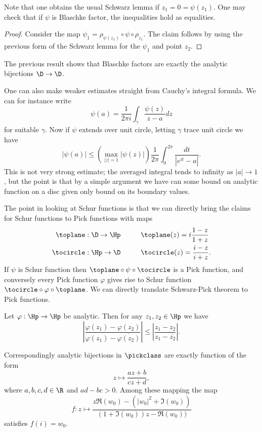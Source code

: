 Note that one obtains the usual Schwarz lemma if $z_{1} = 0 = \psi(z_{1})$. One may check that if $\psi$ is Blaschke factor, the inequalities hold as equalities.
\begin{proof}
	Consider the map $\psi_{1} = \rho_{\psi(z_{1})} \circ \psi \circ \rho_{z_{1}}$. The claim follows by using the previous form of the Schwarz lemma for the $\psi_{1}$ and point $z_{2}$.
\end{proof}

The previous result shows that Blaschke factors are exactly the analytic bijections $\D \to \D$.

One can also make weaker estimates straight from Cauchy's integral formula. We can for instance write
\[
	\psi(a) = \frac{1}{2 \pi i}\int_{\gamma} \frac{\psi(z)}{z - a} dz
\]
for suitable $\gamma$. Now if $\psi$ extends over unit circle, letting $\gamma$ trace unit circle we have
\[
	|\psi(a)| \leq \left(\max_{|z| = 1} \left|\psi(z)\right| \right) \frac{1}{2 \pi}\int_{0}^{2 \pi} \frac{d t}{|e^{i t}  - a|}.
\]
This is not very strong estimate; the averaged integral tends to infinity as $|a| \to 1$, but the point is that by a simple argument we have can some bound on analytic function on a disc given only bound on its boundary values.

The point in looking at Schur functions is that we can directly bring the claims for Schur functions to Pick functions with maps
\begin{align*}
	\toplane : \D \to \Hp & \hspace{1cm} \toplane (z) = i \frac{1 - z}{1 + z} \\
	\tocircle : \Hp \to \D & \hspace{1cm} \tocircle (z) = \frac{i - z}{i + z}.
\end{align*}
If $\psi$ is Schur function then $\toplane \circ \psi \circ \tocircle$ is a Pick function, and conversely every Pick function $\varphi$ gives rise to Schur function $\tocircle \circ \varphi \circ \toplane$. We can directly translate Schwarz-Pick theorem to Pick functions.

\begin{lause}
	Let $\varphi : \Hp \to \Hp$ be analytic. Then for any $z_{1}, z_{2} \in \Hp$ we have
	\[
		\left|\frac{\varphi(z_{1}) - \varphi(z_{2})}{\varphi(z_{1}) - \overline{\varphi(z_{2})}} \right| \leq \left|\frac{z_{1} - z_{2}}{z_{1} - \overline{z_{2}}} \right|.
	\]
\end{lause}

Correspondingly analytic bijections in $\pickclass$ are exactly function of the form
\[
	z \mapsto \frac{a z + b}{c z + d},
\]
where $a, b, c, d \in \R$ and $a d - b c > 0$. Among these mapping the map
\[
	f : z \mapsto \frac{z \Re(w_{0}) - (|w_{0}|^2 + \Im(w_{0}))}{(1 + \Im(w_{0})) z - \Re(w_{0}))}
\]
satisfies $f(i) = w_{0}$.

